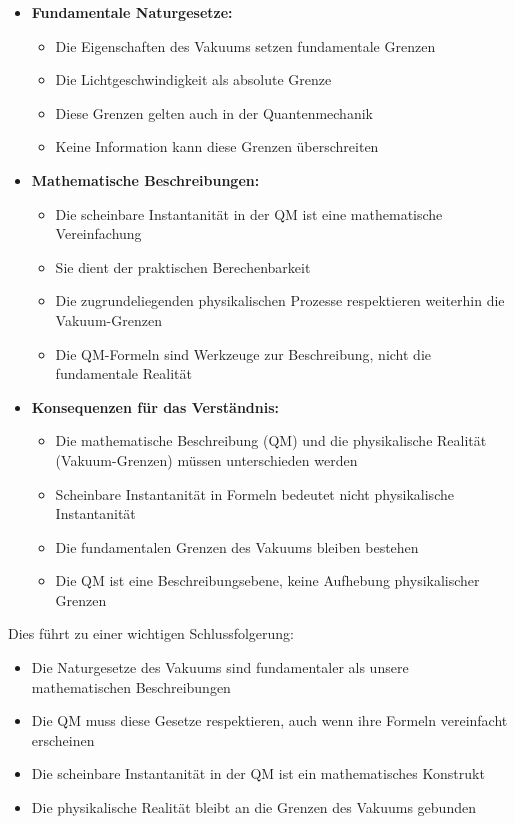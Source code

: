 \documentclass[12pt,a4paper]{article}
\begin{document}
	\begin{itemize}
		\item \textbf{Fundamentale Naturgesetze:}
		\begin{itemize}
			\item Die Eigenschaften des Vakuums setzen fundamentale Grenzen
			\item Die Lichtgeschwindigkeit als absolute Grenze
			\item Diese Grenzen gelten auch in der Quantenmechanik
			\item Keine Information kann diese Grenzen überschreiten
		\end{itemize}
		
		\item \textbf{Mathematische Beschreibungen:}
		\begin{itemize}
			\item Die scheinbare Instantanität in der QM ist eine mathematische Vereinfachung
			\item Sie dient der praktischen Berechenbarkeit
			\item Die zugrundeliegenden physikalischen Prozesse respektieren weiterhin die Vakuum-Grenzen
			\item Die QM-Formeln sind Werkzeuge zur Beschreibung, nicht die fundamentale Realität
		\end{itemize}
		
		\item \textbf{Konsequenzen für das Verständnis:}
		\begin{itemize}
			\item Die mathematische Beschreibung (QM) und die physikalische Realität (Vakuum-Grenzen) müssen unterschieden werden
			\item Scheinbare Instantanität in Formeln bedeutet nicht physikalische Instantanität
			\item Die fundamentalen Grenzen des Vakuums bleiben bestehen
			\item Die QM ist eine Beschreibungsebene, keine Aufhebung physikalischer Grenzen
		\end{itemize}
	\end{itemize}
	
	Dies führt zu einer wichtigen Schlussfolgerung:
	\begin{itemize}
		\item Die Naturgesetze des Vakuums sind fundamentaler als unsere mathematischen Beschreibungen
		\item Die QM muss diese Gesetze respektieren, auch wenn ihre Formeln vereinfacht erscheinen
		\item Die scheinbare Instantanität in der QM ist ein mathematisches Konstrukt
		\item Die physikalische Realität bleibt an die Grenzen des Vakuums gebunden
	\end{itemize}
	
\end{document}
